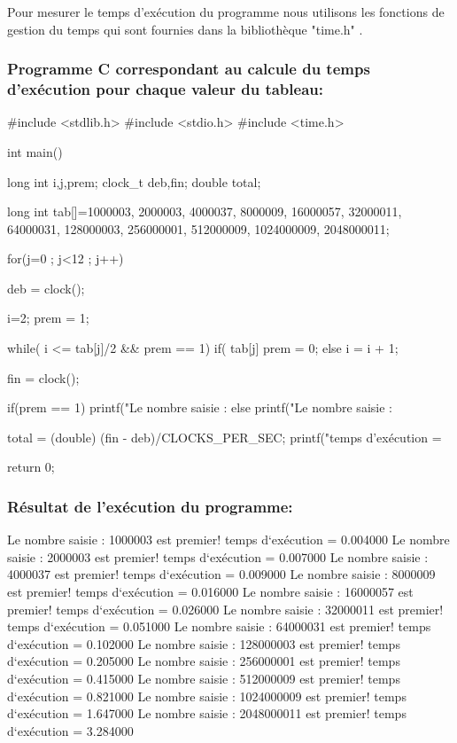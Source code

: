 \documentclass[12pt]{article}
\begin{document}
Pour mesurer le temps d'exécution du programme nous utilisons les fonctions de gestion du temps qui sont fournies dans la bibliothèque "time.h" .

\subsubsection{Programme C correspondant au calcule du temps d'exécution pour chaque valeur du tableau:}
\begin{sql}
#include <stdlib.h>
#include <stdio.h>
#include <time.h>

int main()
{
	long int i,j,prem;
	clock_t deb,fin;
	double total;

	long int tab[]={1000003, 2000003, 4000037, 8000009, 16000057, 32000011,	64000031, 128000003, 256000001,	512000009,	1024000009, 2048000011};

for(j=0 ; j<12 ; j++)
{
	deb = clock();
	
	i=2;
	prem = 1;

	while( i <= tab[j]/2 && prem == 1){
		if( tab[j]%
			prem = 0;
		else
			i = i + 1;
	}

	fin = clock();

	if(prem == 1)
    {
        printf("Le nombre saisie : %
    }
	else{
        printf("Le nombre saisie : %
	}

	total = (double) (fin - deb)/CLOCKS_PER_SEC;
	printf("temps d'exécution = %
}
return 0;
}
\end{sql}

\subsubsection{Résultat de l'exécution du programme:}
\begin{sql}
Le nombre saisie : 1000003 est premier!
temps d`exécution = 0.004000
Le nombre saisie : 2000003 est premier!
temps d`exécution = 0.007000
Le nombre saisie : 4000037 est premier!
temps d`exécution = 0.009000
Le nombre saisie : 8000009 est premier!
temps d`exécution = 0.016000
Le nombre saisie : 16000057 est premier!
temps d`exécution = 0.026000
Le nombre saisie : 32000011 est premier!
temps d`exécution = 0.051000
Le nombre saisie : 64000031 est premier!
temps d`exécution = 0.102000
Le nombre saisie : 128000003 est premier!
temps d`exécution = 0.205000
Le nombre saisie : 256000001 est premier!
temps d`exécution = 0.415000
Le nombre saisie : 512000009 est premier!
temps d`exécution = 0.821000
Le nombre saisie : 1024000009 est premier!
temps d`exécution = 1.647000
Le nombre saisie : 2048000011 est premier!
temps d`exécution = 3.284000

\end{sql}
\end{document}
